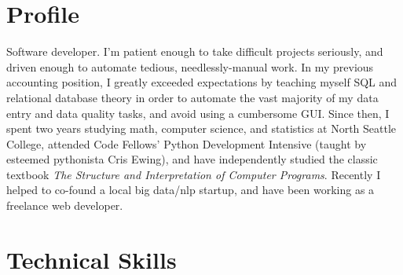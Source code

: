 \documentclass[10pt,a4paper,sans]{moderncv}        %
\begin{document}
\makecvtitle

\section{Profile}
Software developer. I'm patient enough to take difficult projects seriously, and
driven enough to automate tedious, needlessly-manual work. In my previous
accounting position, I greatly exceeded expectations by teaching myself SQL and
relational database theory in order to automate the vast majority of my data
entry and data quality tasks, and avoid using a cumbersome GUI. Since then, I
spent two years studying math, computer science, and statistics at North Seattle
College, attended Code Fellows' Python Development Intensive (taught by esteemed
pythonista Cris Ewing), and have independently studied the classic textbook
\textit{The Structure and Interpretation of Computer Programs}. Recently I
helped to co-found a local big data/nlp startup, and have been working as a
freelance web developer.

\section{Technical Skills}
\begin{cvcolumns}
\end{cvcolumns}

\begin{comment}
  \section{Technical Skills}
  \subsection{Proficient}
  Python, Django, Django REST Framework, Pyramid, Git, SQL, HTML/CSS,
  JavaScript/jQuery, Unix systems, Shell Scripting, Org-mode, Regular Expressions
  \subsection{Familiar}
  AWS Deployment, Heroku Deployment, Ansible, PostgreSQL, Nginx, Gunicorn, Scheme, Sed
\end{comment}
\end{document}

